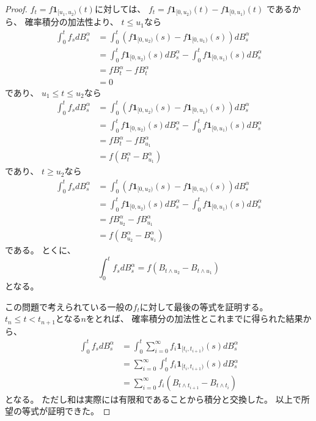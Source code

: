 \documentclass[uplatex]{jsarticle}
\theoremstyle{definition}
\def\I{\mathbf{1}}
\begin{document}
\begin{proof}
  \(f_t = f\I_{[u_1,u_2)}(t)\)に対しては、
  \(f_t = f\I_{[0,u_2)}(t) - f\I_{[0,u_1)}(t)\)
  であるから、
  確率積分の加法性より、
  \(t \leq u_1\)なら
  \begin{align*}
    \int_0^t f_sdB_s^\alpha
    &= \int_0^t (f\I_{[0,u_2)}(s) - f\I_{[0,u_1)}(s))dB_s^\alpha \\
    &= \int_0^t f\I_{[0,u_2)}(s)dB_s^\alpha  - \int_0^t f\I_{[0,u_1)}(s)dB_s^\alpha \\
    &= fB_t^\alpha - fB_t^\alpha \\
    &= 0
  \end{align*}
  であり、
  \(u_1 \leq t \leq u_2\)なら
  \begin{align*}
    \int_0^t f_sdB_s^\alpha
    &= \int_0^t (f\I_{[0,u_2)}(s) - f\I_{[0,u_1)}(s))dB_s^\alpha \\
    &= \int_0^t f\I_{[0,u_2)}(s)dB_s^\alpha  - \int_0^t f\I_{[0,u_1)}(s)dB_s^\alpha \\
    &= fB_t^\alpha - fB_{u_1}^\alpha \\
    &= f(B_t^\alpha-B_{u_1}^\alpha)
  \end{align*}
  であり、
  \(t\geq u_2\)なら
  \begin{align*}
    \int_0^t f_sdB_s^\alpha
    &= \int_0^t (f\I_{[0,u_2)}(s) - f\I_{[0,u_1)}(s))dB_s^\alpha \\
    &= \int_0^t f\I_{[0,u_2)}(s)dB_s^\alpha  - \int_0^t f\I_{[0,u_1)}(s)dB_s^\alpha \\
    &= fB_{u_2}^\alpha - fB_{u_1}^\alpha \\
    &= f(B_{u_2}^\alpha-B_{u_1}^\alpha)
  \end{align*}
  である。
  とくに、
  \[
  \int_0^t f_sdB_s^\alpha
  = f(B_{t\wedge u_2} - B_{t\wedge u_1})
  \]
  となる。

  この問題で考えられている一般の\(f_t\)に対して最後の等式を証明する。
  \(t_n \leq t < t_{n+1}\)となる\(n\)をとれば、
  確率積分の加法性とこれまでに得られた結果から、
  \begin{align*}
    \int_0^t f_sdB_s^\alpha
    &= \int_0^t \sum_{i=0}^\infty f_i\I_{[t_i,t_{i+1})}(s)dB_s^\alpha \\
    &= \sum_{i=0}^\infty \int_0^t f_i\I_{[t_i,t_{i+1})}(s)dB_s^\alpha \\
    &= \sum_{i=0}^\infty f_i(B_{t\wedge t_{i+1}}-B_{t\wedge t_i})
  \end{align*}
  となる。
  ただし和は実際には有限和であることから積分と交換した。
  以上で所望の等式が証明できた。
\end{proof}
\end{document}
